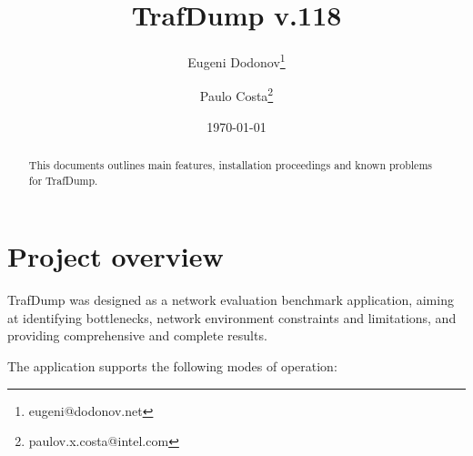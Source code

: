 \documentclass[12pt]{report}
\title{TrafDump v.118}
\author{Eugeni Dodonov\footnote{eugeni@dodonov.net} \and Paulo Costa\footnote{paulov.x.costa@intel.com}}
\date{\today}
\begin{document}
\maketitle

\begin{abstract}

This documents outlines main features, installation proceedings and known problems for TrafDump.

\end{abstract}

\tableofcontents

\chapter{Project overview}

TrafDump was designed as a network evaluation benchmark application, aiming at
identifying bottlenecks, network environment constraints and limitations,
and providing comprehensive and complete results.

The application supports the following modes of operation:
\end{document}
